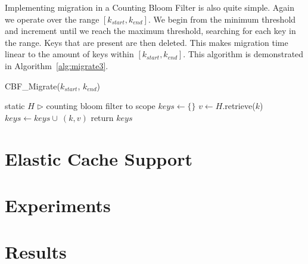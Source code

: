 Implementing migration in a Counting Bloom Filter is also quite simple. Again
we operate over the range $[k_{start},k_{end}]$. We begin from the minimum
threshold and increment until we reach the maximum threshold, searching for
each key in the range. Keys that are present are then deleted. This makes
migration time linear to the amount of keys within $[k_{start},k_{end}]$. This
algorithm is demonstrated in Algorithm~\ref{alg:migrate3}.

\begin{algorithm}[htp]
\small
\caption{\label{alg:migrate3}CBF\_Migrate($k_{start}$, $k_{end}$)} \begin{algorithmic}[1]
\STATE static $H$ $\triangleright$ counting bloom filter to scope
\STATE $keys \leftarrow \{\}$
    \STATE $v \leftarrow H$.retrieve($k$)
      \STATE $keys \leftarrow keys \cup~(k,v)$
    \ENDIF
  \ENDIF
\ENDFOR
\STATE return $keys$
\end{algorithmic}
\end{algorithm}

\section{Elastic Cache Support} %
\label{sec:elastic_cache_support}


\section{Experiments} %
\label{sec:experiments_indexing}


\section{Results} %
\label{sec:results_indexing}


